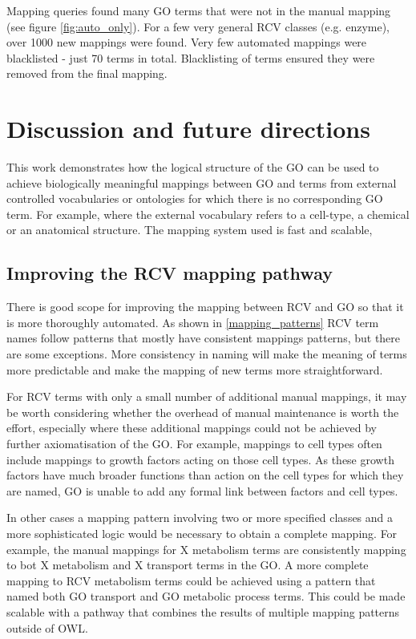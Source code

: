 \documentclass[runningheads,a4paper]{llncs}
\begin{document}
{{Mapping queries found many GO terms that were not in the manual mapping (see figure \ref{fig:auto_only}).  For a few very general RCV classes (e.g. enzyme), over 1000 new mappings were found. Very few automated mappings were blacklisted - just 70 terms in total.  Blacklisting of terms ensured they were removed from the final mapping.


\section{Discussion and future directions}

This work demonstrates how the logical structure of the GO can be used to achieve biologically meaningful mappings between GO and terms from external controlled vocabularies or ontologies for which there is no corresponding GO term.  For example, where the external vocabulary refers to a cell-type, a chemical or an anatomical structure.  The mapping system used is fast and scalable,  

\subsection{Improving the RCV mapping pathway}

There is good scope for improving the mapping between RCV and GO so that it is more thoroughly automated. As shown in \ref{mapping_patterns} RCV term names follow patterns that mostly have consistent mappings patterns, but there are some exceptions.  More consistency in naming will make the meaning of terms more predictable and make the mapping of new terms more straightforward. 

For RCV terms with only a small number of additional manual mappings, it may be worth considering whether the overhead of manual maintenance is worth the effort, especially where these additional mappings could not be achieved by further axiomatisation of the GO.  For example, mappings to cell types often include mappings to growth factors acting on those cell types.  As these growth factors have much broader functions than action on the cell types for which they are named, GO is unable to add any formal link between factors and cell types.

In other cases a mapping pattern involving two or more specified classes and a more sophisticated logic would be necessary to obtain a complete mapping.  For example, the manual mappings for X metabolism terms are consistently mapping to bot X metabolism and X transport terms in the GO. A more complete mapping to RCV metabolism terms could be achieved using a pattern that named both GO transport and GO metabolic process terms.  This could be made scalable with a pathway that combines the results of multiple mapping patterns outside of OWL.

}}
\end{document}
